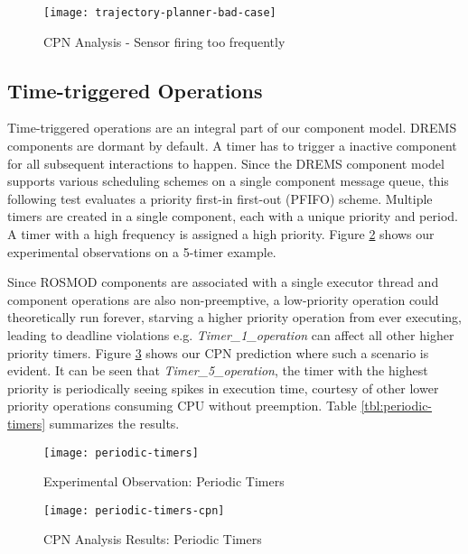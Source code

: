 \begin{figure}[h]
	\centering
	\texttt{[image: trajectory-planner-bad-case]}
	\caption{CPN Analysis - Sensor firing too frequently}
	\label{fig:trajectory-planner-bad-case}
\end{figure}
\FloatBarrier

\subsection{Time-triggered Operations}

Time-triggered operations are an integral part of our component model. DREMS components are dormant by default. A timer has to trigger a inactive component for all subsequent interactions to happen. Since the DREMS component model supports various scheduling schemes on a single component message queue, this following test evaluates a priority first-in first-out (PFIFO) scheme. Multiple timers are created in a single component, each with a unique priority and period. A timer with a high frequency is assigned a high priority. Figure \ref{fig:periodic-timers} shows our experimental observations on a 5-timer example. 

Since ROSMOD components are associated with a single executor thread and component operations are also non-preemptive, a low-priority operation could theoretically run forever, starving a higher priority operation from ever executing, leading to deadline violations e.g. \emph{Timer\_1\_operation} can affect all other higher priority timers. Figure \ref{fig:periodic-timers-cpn} shows our CPN prediction where such a scenario is evident. It can be seen that \emph{Timer\_5\_operation}, the timer with the highest priority is periodically seeing spikes in execution time, courtesy of other lower priority operations consuming CPU without preemption. Table \ref{tbl:periodic-timers} summarizes the results.

\begin{figure}[h]
	\centering
	\texttt{[image: periodic-timers]}
	\caption{Experimental Observation: Periodic Timers}
	\label{fig:periodic-timers}
\end{figure}
\FloatBarrier

\begin{figure}[h]
	\centering
	\texttt{[image: periodic-timers-cpn]}
	\caption{CPN Analysis Results: Periodic Timers}
	\label{fig:periodic-timers-cpn}
\end{figure}
\FloatBarrier

